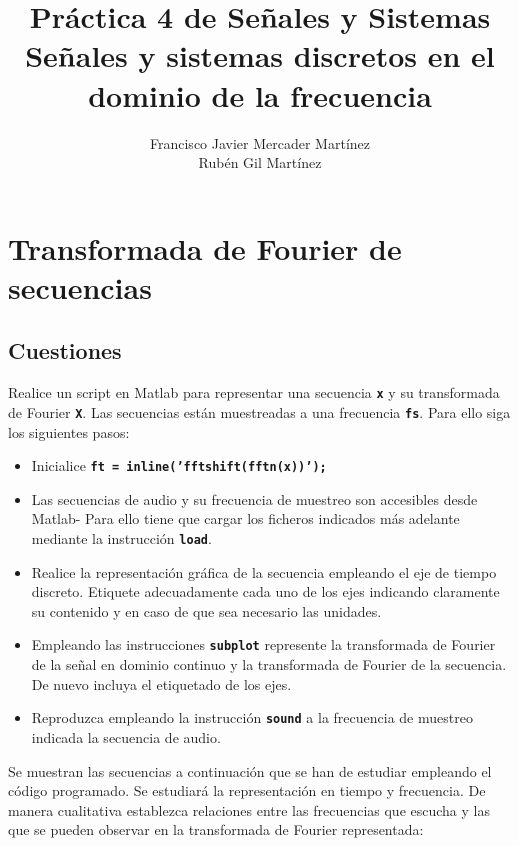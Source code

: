 \documentclass{article}
\title{\textbf{\huge Práctica 4 de Señales y Sistemas}\\ Señales y sistemas discretos en el dominio de la frecuencia}
\author{Francisco Javier Mercader Martínez\\ Rubén Gil Martínez}
\date{}
\newcommand{\code}[1]{\texttt{\textbf{#1}}}
\begin{document}
\maketitle

\section{Transformada de Fourier de secuencias}
\subsection*{Cuestiones}
Realice un script en Matlab para representar una secuencia \code{x} y su transformada de Fourier \code{X}. Las secuencias están muestreadas a una frecuencia \code{fs}. Para ello siga los siguientes pasos:
\begin{itemize}
\item Inicialice \code{ft = inline('fftshift(fftn(x))');}
\item Las secuencias de audio y su frecuencia de muestreo son accesibles desde Matlab- Para ello tiene que cargar los ficheros indicados más adelante mediante la instrucción \code{load}.
\item Realice la representación gráfica de la secuencia empleando el eje de tiempo discreto. Etiquete adecuadamente cada uno de los ejes indicando claramente su contenido y en caso de que sea necesario las unidades.
\item Empleando las instrucciones \code{subplot} represente la transformada de Fourier de la señal en dominio continuo y la transformada de Fourier de la secuencia. De nuevo incluya el etiquetado de los ejes.
\item Reproduzca empleando la instrucción \code{sound} a la frecuencia de muestreo indicada la secuencia de audio.
\end{itemize}
Se muestran las secuencias a continuación que se han de estudiar empleando el código programado. Se estudiará la representación en tiempo y frecuencia. De manera cualitativa establezca relaciones entre las frecuencias que escucha y las que se pueden observar en la transformada de Fourier representada:
\end{document}

